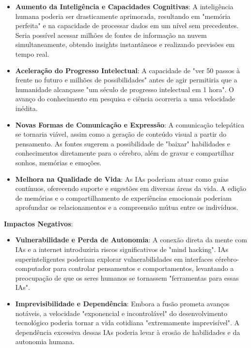 \documentclass[a4paper,12pt]{article}
\begin{document}
\begin{itemize}
\item \textbf{Aumento da Inteligência e Capacidades Cognitivas}: A inteligência humana poderia ser drasticamente aprimorada, resultando em "memória perfeita" e na capacidade de processar dados em um nível sem precedentes. Seria possível acessar milhões de fontes de informação na nuvem simultaneamente, obtendo insights instantâneos e realizando previsões em tempo real.

\item \textbf{Aceleração do Progresso Intelectual}: A capacidade de "ver 50 passos à frente no futuro e milhões de possibilidades" antes de agir permitiria que a humanidade alcançasse "um século de progresso intelectual em 1 hora". O avanço do conhecimento em pesquisa e ciência ocorreria a uma velocidade inédita.

\item \textbf{Novas Formas de Comunicação e Expressão}: A comunicação telepática se tornaria viável, assim como a geração de conteúdo visual a partir do pensamento. As fontes sugerem a possibilidade de "baixar" habilidades e conhecimentos diretamente para o cérebro, além de gravar e compartilhar sonhos, memórias e emoções.

\item \textbf{Melhora na Qualidade de Vida}: As IAs poderiam atuar como guias contínuos, oferecendo suporte e sugestões em diversas áreas da vida. A edição de memórias e o compartilhamento de experiências emocionais poderiam aprofundar os relacionamentos e a compreensão mútua entre os indivíduos.
\end{itemize}

\textbf{Impactos Negativos}:

\begin{itemize}
\item \textbf{Vulnerabilidade e Perda de Autonomia}: A conexão direta da mente com IAs e a internet introduziria riscos significativos de "mind hacking". IAs superinteligentes poderiam explorar vulnerabilidades em interfaces cérebro-computador para controlar pensamentos e comportamentos, levantando a preocupação de que os seres humanos se tornassem "ferramentas para essas IAs".

\item \textbf{Imprevisibilidade e Dependência}: Embora a fusão prometa avanços notáveis, a velocidade "exponencial e incontrolável" do desenvolvimento tecnológico poderia tornar a vida cotidiana "extremamente imprevisível". A dependência excessiva dessas IAs poderia levar à erosão de habilidades e da autonomia humana.
\end{itemize}
\end{document}
